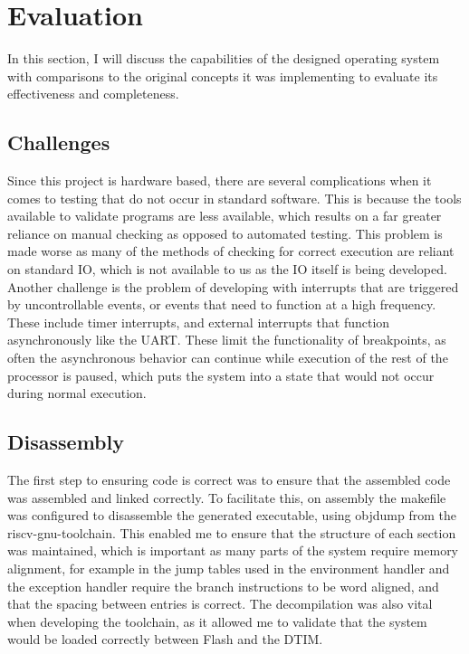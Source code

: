 \chapter[Evaluation]{Evaluation}
\label{cha:eval}
In this section, I will discuss the capabilities of the designed operating system with comparisons to the original concepts it was implementing to evaluate its effectiveness and completeness.
\section{Challenges}
Since this project is hardware based, there are several complications when it comes to testing that do not occur in standard software. This is because the tools available to validate programs are less available, which results on a far greater reliance on manual checking as opposed to automated testing. This problem is made worse as many of the methods of checking for correct execution are reliant on standard IO, which is not available to us as the IO itself is being developed.\\
Another challenge is the problem of developing with interrupts that are triggered by uncontrollable events, or events that need to function at a high frequency. These include timer interrupts, and external interrupts that function asynchronously like the UART. These limit the functionality of breakpoints, as often the asynchronous behavior can continue while execution of the rest of the processor is paused, which puts the system into a state that would not occur during normal execution.
\section{Disassembly}%
The first step to ensuring code is correct was to ensure that the assembled code was assembled and linked correctly. To facilitate this, on assembly the makefile was configured to disassemble the generated executable, using objdump from the riscv-gnu-toolchain. This enabled me to ensure that the structure of each section was maintained, which is important as many parts of the system require memory alignment, for example in the jump tables used in the environment handler and the exception handler require the branch instructions to be word aligned, and that the spacing between entries is correct. The decompilation was also vital when developing the toolchain, as it allowed me to validate that the system would be loaded correctly between Flash and the DTIM.

